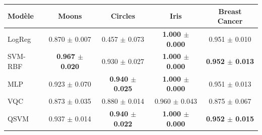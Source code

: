 \begin{tabular}{lcccc}
\toprule
Modèle & Moons & Circles & Iris & Breast Cancer \\
\midrule
LogReg & 0.870 $\pm$ 0.007 & 0.457 $\pm$ 0.073 & \textbf{1.000 $\pm$ 0.000} & 0.951 $\pm$ 0.010 \\
SVM-RBF & \textbf{0.967 $\pm$ 0.020} & 0.930 $\pm$ 0.027 & \textbf{1.000 $\pm$ 0.000} & \textbf{0.952 $\pm$ 0.013} \\
MLP & 0.923 $\pm$ 0.070 & \textbf{0.940 $\pm$ 0.025} & \textbf{1.000 $\pm$ 0.000} & 0.951 $\pm$ 0.013 \\
\midrule
VQC & 0.873 $\pm$ 0.035 & 0.880 $\pm$ 0.014 & 0.960 $\pm$ 0.043 & 0.875 $\pm$ 0.067 \\
QSVM & 0.937 $\pm$ 0.014 & \textbf{0.940 $\pm$ 0.022} & \textbf{1.000 $\pm$ 0.000} & \textbf{0.952 $\pm$ 0.015} \\
\bottomrule
\end{tabular}